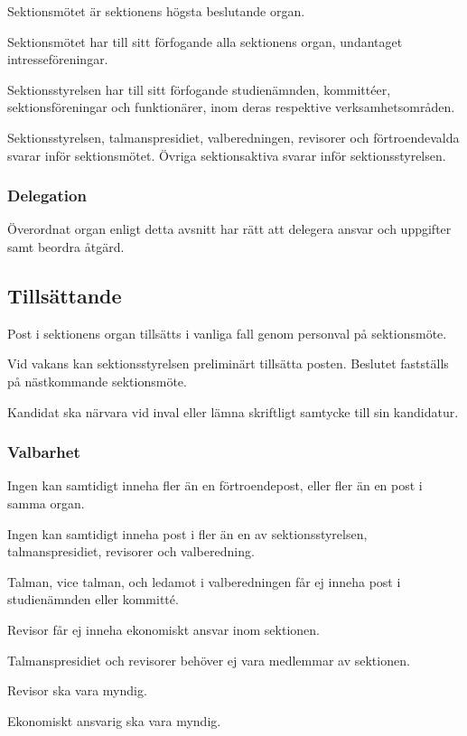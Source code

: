 \documentclass{styrdokument}
\begin{document}
\? Sektionsmötet är sektionens högsta beslutande organ.

\? Sektionsmötet har till sitt förfogande alla sektionens organ, undantaget intresseföreningar.

\? Sektionsstyrelsen har till sitt förfogande studienämnden, kommittéer, sektionsföreningar och funktionärer, inom deras respektive verksamhetsområden.

\? Sektionsstyrelsen, talmanspresidiet, valberedningen, revisorer och förtroendevalda svarar inför sektionsmötet.
Övriga sektionsaktiva svarar inför sektionsstyrelsen.

\subsubsection{Delegation}
\? Överordnat organ enligt detta avsnitt har rätt att delegera ansvar och uppgifter samt beordra åtgärd.

\subsection{Tillsättande}

\? Post i sektionens organ tillsätts i vanliga fall genom personval på sektionsmöte.
\label{tills.personval}

\? Vid vakans kan sektionsstyrelsen preliminärt tillsätta posten.
Beslutet fastställs på nästkommande sektionsmöte.

\? Kandidat ska närvara vid inval eller lämna skriftligt samtycke till sin kandidatur.

\subsubsection{Valbarhet}
\? Ingen kan samtidigt inneha fler än en förtroendepost, eller fler än en post i samma organ.

\? Ingen kan samtidigt inneha post i fler än en av sektionsstyrelsen, talmanspresidiet, revisorer och valberedning.

\? Talman, vice talman, och ledamot i valberedningen får ej inneha post i studienämnden eller kommitté.

\? Revisor får ej inneha ekonomiskt ansvar inom sektionen.

\? Talmanspresidiet och revisorer behöver ej vara medlemmar av sektionen.

\? Revisor ska vara myndig.

\? Ekonomiskt ansvarig ska vara myndig.
\end{document}

